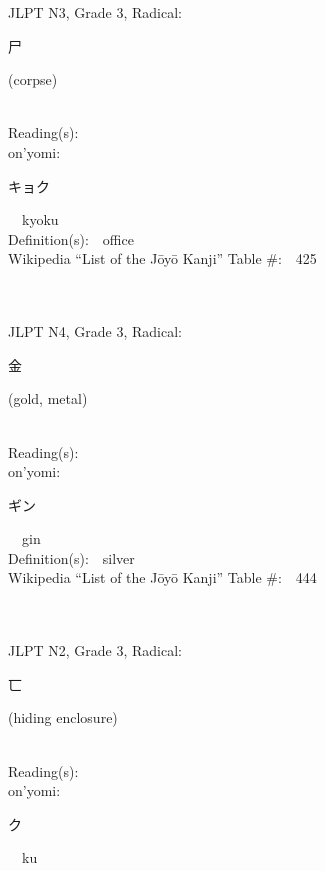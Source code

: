 \begin{multicols}{2}
{JLPT N3, Grade 3, Radical:\ \ {\begin{CJK}{UTF8}{min} 尸 \end{CJK}} (corpse) } \\
Reading(s):\ \ \\
{\hspace*{1em}}on'yomi:\ \ \\
{\hspace*{2em}}{\begin{CJK}{UTF8}{min} キョク \end{CJK}}\ \ kyoku\ \ \\
Definition(s):\ \ office \\
Wikipedia ``List of the J\=oy\=o Kanji'' Table \#:\ \ 425 \\
\ \ \\
{\fontsize{34pt}{40pt}  }\ \ \\  %
{JLPT N4, Grade 3, Radical:\ \ {\begin{CJK}{UTF8}{min} 金 \end{CJK}} (gold, metal) } \\
Reading(s):\ \ \\
{\hspace*{1em}}on'yomi:\ \ \\
{\hspace*{2em}}{\begin{CJK}{UTF8}{min} ギン \end{CJK}}\ \ gin\ \ \\
Definition(s):\ \ silver \\
Wikipedia ``List of the J\=oy\=o Kanji'' Table \#:\ \ 444 \\
\ \ \\
{\fontsize{34pt}{40pt}  }\ \ \\  %
{JLPT N2, Grade 3, Radical:\ \ {\begin{CJK}{UTF8}{min} 匸 \end{CJK}} (hiding enclosure) } \\
Reading(s):\ \ \\
{\hspace*{1em}}on'yomi:\ \ \\
{\hspace*{2em}}{\begin{CJK}{UTF8}{min} ク \end{CJK}}\ \ ku\ \ \\

\end{multicols}
